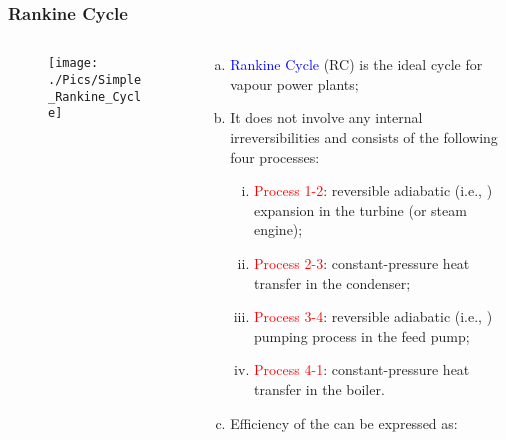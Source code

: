 \documentclass[10pt,compress,handout,unknownkeysallowed]{beamer}
\begin{document}
\begin{frame}
 \frametitle{Rankine Cycle}
 \begin{columns}
   \begin{column}[c]{0.5\linewidth}
    \begin{figure}%
     \begin{center}
      \texttt{[image: ./Pics/Simple\_Rankine\_Cycle]}
     \end{center}
    \end{figure}  
   \end{column}
   \begin{column}[l]{0.5\linewidth}
    \begin{enumerate}[(a)]\scriptsize
     \item<1->\textcolor{blue}{Rankine Cycle} (RC) is the ideal cycle for vapour power plants;
     \item<2-> It does not involve any internal irreversibilities and consists of the following four processes:
     \begin{enumerate}[(i)]\scriptsize
      \item<3-> \textcolor{red}{Process 1-2}: reversible adiabatic (i.e., ) expansion in the turbine (or steam engine);
      \item<4-> \textcolor{red}{Process 2-3}: constant-pressure heat transfer in the condenser;
      \item<5-> \textcolor{red}{Process 3-4}: reversible adiabatic (i.e., ) pumping process in the feed pump;
      \item<6-> \textcolor{red}{Process 4-1}: constant-pressure heat transfer in the boiler.  
     \end{enumerate}
     \item<7-> Efficiency of the  can be expressed as:
    \end{enumerate}
   \end{column}
  \end{columns}
 \normalsize
\end{frame}
\end{document}
